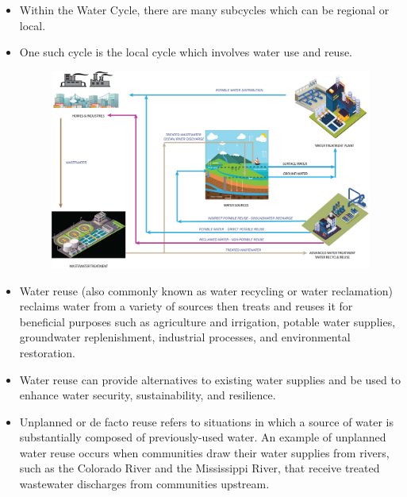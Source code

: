 \begin{itemize}
\item Within the Water Cycle, there are many subcycles which can be regional or local.
\item One such cycle is the local cycle which involves water use and reuse.\\

\begin{figure}
\includegraphics[scale=0.2]{Test4}\\
\end{figure}

\item Water reuse (also commonly known as water recycling or water reclamation) reclaims water from a variety of sources then treats and reuses it for beneficial purposes such as agriculture and irrigation, potable water supplies, groundwater replenishment, industrial processes, and environmental restoration.
\item Water reuse can provide alternatives to existing water supplies and be used to enhance water security, sustainability, and resilience.

\item Unplanned or de facto reuse refers to situations in which a source of water is substantially composed of previously-used water. An example of unplanned water reuse occurs when communities draw their water supplies from rivers, such as the Colorado River and the Mississippi River, that receive treated wastewater discharges from communities upstream.




\end{itemize}
